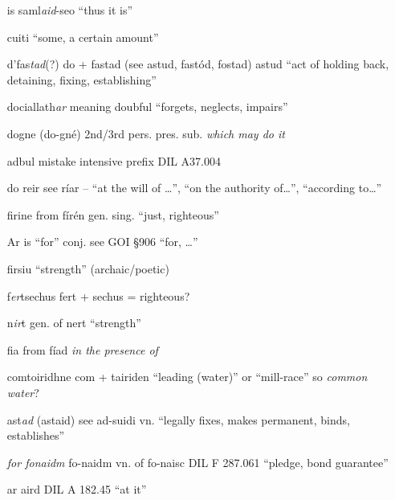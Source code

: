 \documentclass[11pt]{article}
\begin{document}
\begin{enumerate}
  \item[is saml\emph{aid}-seo] \enquote{thus it is}

  \item[cuiti] \enquote{some, a certain amount}

  \item[d'fas\emph{tad}(?)] do + fastad (see astud, fast\'{o}d, fostad) astud \enquote{act of holding back, detaining, fixing, establishing}

  \item[dociallath\emph{ar}] meaning doubful \enquote{forgets, neglects, impairs}

  \item[dogne] (do-gn\'{e}) 2nd/3rd pers. pres. sub. \emph{which may do it}

  \item[adbul] mistake intensive prefix DIL A37.004

  \item[do reir] see r\'{i}ar -- \enquote{at the will of \ldots}, \enquote{on the authority of\ldots}, \enquote{according to\ldots}

  \item[firine] from f\'{i}r\'{e}n gen. sing. \enquote{just, righteous}

  \item[Ar is] \enquote{for} conj. see GOI \S 906 \enquote{for, \ldots}

  \item[firsiu] \enquote{strength} (archaic/poetic)

  \item[f\emph{er}tsechus] fert + sechus = righteous?

  \item[n\emph{ir}t] gen. of nert \enquote{strength}

  \item[fia] from f\'{i}ad \emph{in the presence of}

  \item[comtoiridhne] com + tairiden \enquote{leading (water)} or \enquote{mill-race} so \emph{common water}?

  \item[ast\emph{ad}] (astaid) see ad-suidi vn. \enquote{legally fixes, makes permanent, binds, establishes}

  \item[\emph{f\emph{or} fonaidm}] fo-naidm vn. of fo-naisc DIL F 287.061 \enquote{pledge, bond guarantee} 

  \item[ar aird] DIL A 182.45 \enquote{at it}


\end{enumerate}
\end{document}
